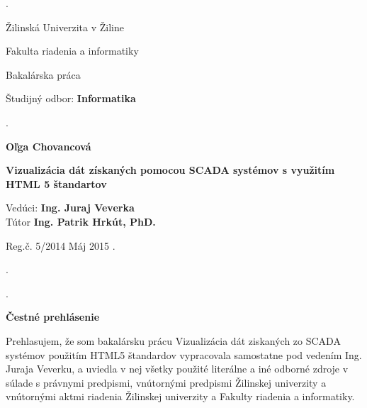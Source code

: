 \begin{titlepage}
\phantom.

\bigskip

\begin{center}
{\sc\LARGE Žilinská Univerzita v Žiline}
\medskip

{\sc\Large Fakulta riadenia a informatiky}

\vfill\vfill\vfill\vfill

{\sc\LARGE Bakalárska práca}

\medskip

{\large Študijný odbor: {\bf Informatika}}
\end{center}


\vfill\vfill\vfill\vfill


\phantom.\hfill

\begin{center}
{\large\bf Oľga Chovancová}

\medskip

{\large\bf Vizualizácia dát získaných pomocou SCADA systémov s využitím HTML 5 štandartov}

\medskip

Vedúci: {\bf Ing. Juraj Veverka}\\
Tútor	\textbf{Ing. Patrik Hrkút, PhD.}
\medskip
 
\hfill
Reg.č. 5/2014
\hfill
Máj 2015
\hfill\phantom.
\end{center}

\hspace{1.7cm}\phantom.

\vspace{2.9cm}

\phantom.
\end{titlepage}

\newpage

\centerline{\bf Čestné prehlásenie}

\vspace{2em}

\noindent
Prehlasujem, že som bakalársku prácu Vizualizácia dát ziskaných zo SCADA systémov použitím HTML5 štandardov vypracovala samostatne pod vedením Ing. Juraja Veverku, a uviedla v nej všetky použité literálne a iné odborné zdroje v súlade s právnymi predpismi, vnútornými predpismi Žilinskej univerzity a vnútornými aktmi riadenia Žilinskej univerzity a Fakulty riadenia a informatiky.


